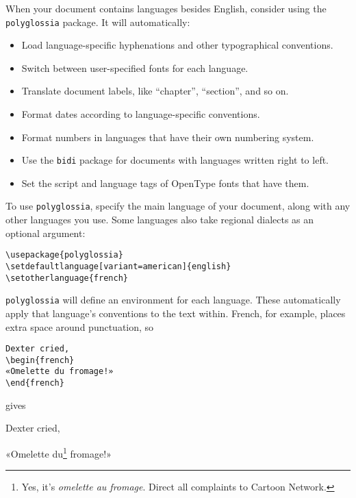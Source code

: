 When your document contains languages besides English,
consider using the \texttt{polyglossia} package.
It will automatically:
\begin{itemize}
\item Load language-specific hyphenations and other typographical
    conventions.
\item Switch between user-specified fonts for each language.
\item Translate document labels,
    like ``chapter''\quotekern, ``section''\quotekern, and so on.
\item Format dates according to language-specific conventions.
\item Format numbers in languages that have their own numbering system.
\item Use the \texttt{bidi} package for documents with languages written
    right to left.
\item Set the script and language tags of OpenType fonts that have them.
\end{itemize}
To use \texttt{polyglossia}, specify the main language of your document,
along with any other languages you use.
Some languages also take regional dialects as an optional argument:
\begin{leftfigure}
\begin{lstlisting}
\usepackage{polyglossia}
\setdefaultlanguage[variant=american]{english}
\setotherlanguage{french}
\end{lstlisting}
\end{leftfigure}
\texttt{polyglossia} will define an environment for each language.
These automatically apply that language's conventions to the text within.
French, for example, places extra space around punctuation, so
\begin{leftfigure}
\begin{lstlisting}
Dexter cried,
\begin{french}
«Omelette du fromage!»
\end{french}
\end{lstlisting}
\end{leftfigure}
gives
\begin{leftfigure}
\lm%
Dexter cried,
\begin{french}
\lm%
«Omelette du\footnote{Yes, it's \emph{omelette au fromage}.
Direct all complaints to Cartoon Network.} fromage!»
\end{french}
\end{leftfigure}


